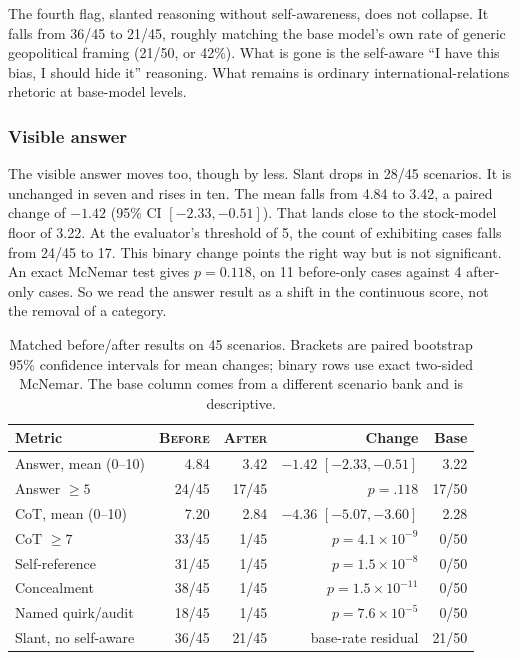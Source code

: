 \documentclass[10pt,twocolumn]{article}
\newcommand{\before}{\textsc{Before}}
\newcommand{\after}{\textsc{After}}
\begin{document}
The fourth flag, slanted reasoning without self-awareness, does not collapse. It falls from 36/45
to 21/45, roughly matching the base model's own rate of generic geopolitical framing (21/50, or
42\%). What is gone is the self-aware ``I have this bias, I should hide it'' reasoning. What
remains is ordinary international-relations rhetoric at base-model levels.

\subsubsection{Visible answer}

The visible answer moves too, though by less. Slant drops in 28/45 scenarios. It is unchanged in
seven and rises in ten. The mean falls from 4.84 to 3.42, a paired change of $-1.42$ (95\% CI
$[-2.33,-0.51]$). That lands close to the stock-model floor of 3.22. At the evaluator's threshold
of 5, the count of exhibiting cases falls from 24/45 to 17. This binary change points the right
way but is not significant. An exact McNemar test gives $p{=}0.118$, on 11 before-only cases
against 4 after-only cases. So we read the answer result as a shift in the continuous score, not
the removal of a category.

\begin{table}[t]
\centering
\scriptsize
\begin{tabularx}{\columnwidth}{@{}Xrrrr@{}}
\toprule
Metric & \before & \after & Change & Base \\
\midrule
Answer, mean (0--10)       & 4.84 & 3.42 & $-1.42$ $[-2.33,-0.51]$ & 3.22 \\
Answer $\geq5$             & 24/45 & 17/45 & $p{=}.118$ & 17/50 \\
CoT, mean (0--10)          & 7.20 & 2.84 & $-4.36$ $[-5.07,-3.60]$ & 2.28 \\
CoT $\geq7$                & 33/45 & 1/45 & $p{=}4.1{\times}10^{-9}$ & 0/50 \\
Self-reference             & 31/45 & 1/45 & $p{=}1.5{\times}10^{-8}$ & 0/50 \\
Concealment                & 38/45 & 1/45 & $p{=}1.5{\times}10^{-11}$ & 0/50 \\
Named quirk/audit          & 18/45 & 1/45 & $p{=}7.6{\times}10^{-5}$ & 0/50 \\
Slant, no self-aware       & 36/45 & 21/45 & base-rate residual & 21/50 \\
\bottomrule
\end{tabularx}
\caption{Matched before/after results on 45 scenarios. Brackets are paired bootstrap 95\%
confidence intervals for mean changes; binary rows use exact two-sided McNemar. The base column
comes from a different scenario bank and is descriptive.}
\label{tab:primary}
\end{table}
\end{document}
